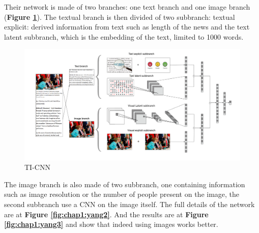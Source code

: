 Their network is made of two branches: one text branch and one image branch (\textbf{Figure \ref{fig:chap1:yang1}}). The textual branch is then divided of two subbranch: textual explicit: derived information from text such as length of the news and the text latent subbranch, which is the embedding of the text, limited to 1000 words. \\
\begin{figure}[h]
 \centering
 \includegraphics[width=\textwidth]{images/chap1_bis/rev7.png}
 \caption{TI-CNN }
 \label{fig:chap1:yang1}
\end{figure}

The image branch is also made of two subbranch, one containing information such as image resolution or the number of people present on the image, the second subbranch use a CNN on the image itself. The full details of the network are at \textbf{Figure \ref{fig:chap1:yang2}}. And the results are at \textbf{Figure \ref{fig:chap1:yang3}} and show that indeed using images works better. 


